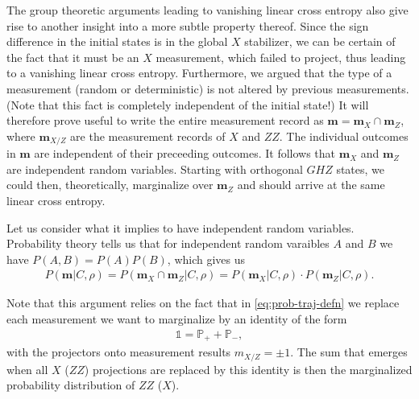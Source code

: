 The group theoretic arguments leading to vanishing linear cross entropy also
give rise to another insight into a more subtle property thereof. Since the
sign difference in the initial states is in the global $X$ stabilizer, we can
be certain of the fact that it must be an $X$ measurement, which failed to
project, thus leading to a vanishing linear cross entropy. Furthermore, we
argued that the type of a measurement (random or deterministic) is not altered
by previous measurements. (Note that this fact is completely independent of the
initial state!)
It will therefore prove useful to write the entire
measurement record as $\mathbf{m} = \mathbf{m}_X \cap \mathbf{m}_Z$, where
$\mathbf{m}_{X/Z}$ are the measurement records of $X$ and $ZZ$. The individual
outcomes in $\mathbf{m}$ are independent of their preceeding outcomes. It
follows that $\mathbf{m}_X$ and $\mathbf{m}_Z$ are independent random variables. 
Starting with orthogonal $GHZ$ states, we
could then, theoretically, marginalize over $\mathbf{m}_Z$ and should arrive at
the same linear cross entropy.

Let us consider what it implies to have independent random
variables.
Probability theory tells us that for independent random varaibles $A$ and $B$
we have $P(A, B) = P(A)P(B)$, which gives us
\begin{align}
      P(\mathbf{m} | C, \rho) = P(\mathbf{m}_X \cap \mathbf{m}_Z | C, \rho) =
    P(\mathbf{m}_X | C, \rho)\cdot P(\mathbf{m}_Z | C, \rho)
.\end{align}

Note that this argument relies on the fact that in \cref{eq:prob-traj-defn} we replace each measurement we
want to marginalize by an identity of the form
\begin{align}
  \mathds{1} = \mathbb{P}_+ + \mathbb{P}_-
,\end{align}
with the projectors onto measurement results $m_{X /Z} = \pm 1$. The sum that
emerges when all $X$ ($ZZ$) projections are replaced by this identity is then
the marginalized probability distribution of $ZZ$ ($X$).

